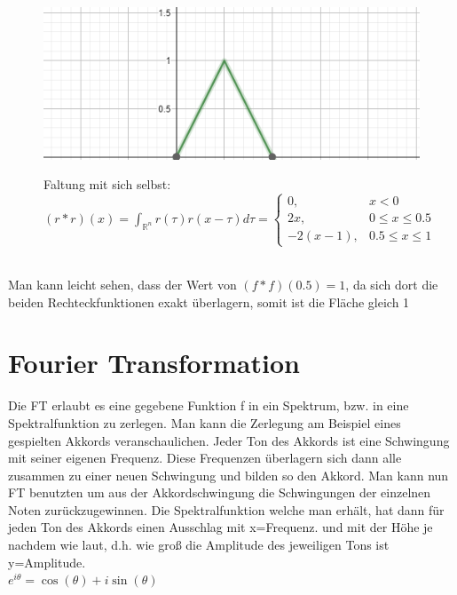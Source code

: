 \documentclass[12pt,a4paper]{article}
\newcommand{\nl}{\\[0.1cm]}
\begin{document}
\begin{minipage}{\linewidth}
\centering
\begin{minipage}{0.45\linewidth}
\begin{figure}[H]
\includegraphics[width=\linewidth]{./resources/rechteck_faltung.png}
\end{figure}
\end{minipage}
\hspace{0.05\linewidth}
\begin{minipage}{0.45\linewidth}
\begin{figure}[H]
Faltung mit sich selbst: $(r\ast r)(x) = \displaystyle \int_{\mathbb{R}^n} r(\tau)r(x-\tau)d\tau = \begin{cases} 0,& x<0 \\ 2x, & 0 \leq x \leq 0.5 \\ -2(x-1), & 0.5 \leq x \leq 1 \end{cases}$
\end{figure}
\end{minipage}
\end{minipage}
\nl
Man kann leicht sehen, dass der Wert von $(f \ast f) (0.5) = 1$, da sich dort die beiden Rechteckfunktionen exakt überlagern, somit ist die Fläche gleich 1

\section{Fourier Transformation}
Die FT erlaubt es eine gegebene Funktion f in ein Spektrum, bzw. in eine Spektralfunktion zu zerlegen. Man kann die Zerlegung am Beispiel eines gespielten Akkords veranschaulichen. Jeder Ton des Akkords ist eine Schwingung mit seiner eigenen Frequenz. Diese Frequenzen überlagern sich dann alle zusammen zu einer neuen Schwingung und bilden so den Akkord. Man kann nun FT benutzten um aus der Akkordschwingung die Schwingungen der einzelnen Noten zurückzugewinnen. Die Spektralfunktion welche man erhält, hat dann für jeden Ton des Akkords einen Ausschlag mit x=Frequenz. und mit der Höhe je nachdem wie laut, d.h. wie groß die Amplitude des jeweiligen Tons ist y=Amplitude.\nl
$e^{i\theta}  =  \cos (\theta) + i \sin (\theta)$
\end{document}
